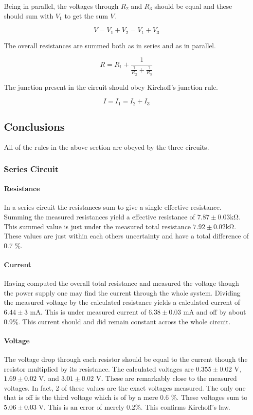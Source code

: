\documentclass[11pt]{article}
\begin{document}
Being in parallel, the voltages through \(R_2\) and \(R_3\) should be equal and these should sum with \(V_1\) to get the sum \(V\).

\begin{equation}
V = V_1 + V_2 = V_1 + V_3
\end{equation}

The overall resistances are summed both as in series and as in parallel. 

\begin{equation}
R = R_1 + \frac{1}{\frac{1}{R_2}+\frac{1}{R_3}}
\end{equation}

The junction present in the circuit should obey Kirchoff's junction rule.

\begin{equation}
I = I_1 = I_2 + I_3
\end{equation}
\subsection{Conclusions}
All of the rules in the above section are obeyed by the three circuits.
\subsubsection{Series Circuit} 
\paragraph{Resistance}
In a series circuit the resistances sum to give a single effective resistance. Summing the measured resistances yield a effective resistance of \(  7.87 \pm 0.03 \mathrm{ k \Omega } \). This summed value is just under the measured total resistance  \( 7.92 \pm 0.02 \mathrm{ k \Omega }\). These values are just within each others uncertainty and have a total difference of 0.7 \%.
\paragraph{Current} Having computed the overall total resistance and measured the voltage though the power supply one may find the current through the whole system. Dividing the measured voltage by the calculated resistance yields a calculated current of \( 6.44 \pm 3\) mA. This is under measured current of \(6.38 \pm 0.03\) mA and off by about 0.9\%. This current should and did remain constant across the whole circuit.
\paragraph{Voltage}
The voltage drop through each resistor should be equal to the current though the resistor multiplied by its resistance. The calculated voltages are \(0.355 \pm 0.02\) V, \(1.69 \pm 0.02\) V, and \( 3.01 \pm 0.02 \) V. These are remarkably close to the measured voltages. In fact, 2 of these values are the exact voltages measured. The only one that is off is the third voltage which is of by a mere 0.6 \%. These voltages sum to \(5.06 \pm 0.03\) V. This is an error of merely 0.2\%. This confirms Kirchoff's law.
\end{document}
